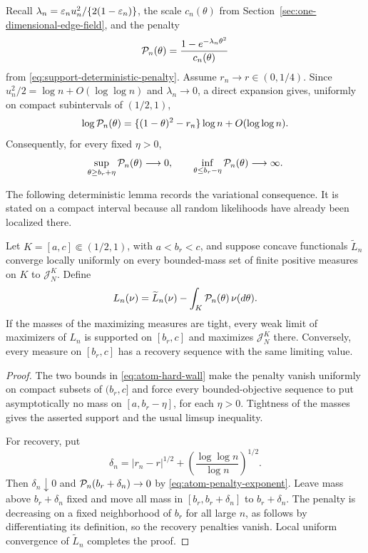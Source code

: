 Recall \(\lambda_n=\varepsilon_nu_n^2/\{2(1-\varepsilon_n)\}\), the scale
\(c_n(\theta)\) from Section~\ref{sec:one-dimensional-edge-field}, and the
penalty
\[
    \mathcal P_n(\theta)
    =\frac{1-e^{-\lambda_n\theta^2}}{c_n(\theta)}
\]
from \eqref{eq:support-deterministic-penalty}. Assume
\(r_n\to r\in(0,1/4)\). Since
\(u_n^2/2=\log n+O(\log\log n)\) and \(\lambda_n\to0\), a direct expansion
gives, uniformly on compact subintervals of \((1/2,1)\),
\begin{equation}
\label{eq:atom-penalty-exponent}
    \log\mathcal P_n(\theta)
    =\{(1-\theta)^2-r_n\}\log n+O(\log\log n).
\end{equation}
Consequently, for every fixed \(\eta>0\),
\begin{equation}
\label{eq:atom-hard-wall}
    \sup_{\theta\ge b_r+\eta}\mathcal P_n(\theta)\longrightarrow0,
    \qquad
    \inf_{\theta\le b_r-\eta}\mathcal P_n(\theta)\longrightarrow\infty.
\end{equation}

The following deterministic lemma records the variational consequence. It is
stated on a compact interval because all random likelihoods have already been
localized there.
\begin{lemma}
\label{lem:atom-hard-wall}
Let \(K=[a,c]\Subset(1/2,1)\), with \(a<b_r<c\), and suppose concave
functionals \(\widetilde L_n\) converge locally uniformly on every
bounded-mass set of finite positive measures on \(K\) to
\(\mathcal J_N^K\). Define
\[
    L_n(\nu)=\widetilde L_n(\nu)-\int_K\mathcal P_n(\theta)\,\nu(d\theta).
\]
If the masses of the maximizing measures are tight, every weak limit of
maximizers of \(L_n\) is supported on \([b_r,c]\) and maximizes
\(\mathcal J_N^K\) there. Conversely, every measure on \([b_r,c]\) has a
recovery sequence with the same limiting value.
\end{lemma}

\begin{proof}
The two bounds in \eqref{eq:atom-hard-wall} make the penalty vanish uniformly
on compact subsets of \((b_r,c]\) and force every bounded-objective sequence
to put asymptotically no mass on \([a,b_r-\eta]\), for each \(\eta>0\).
Tightness of the masses gives the asserted support and the usual limsup
inequality.

For recovery, put
\[
    \delta_n=|r_n-r|^{1/2}
       +\left(\frac{\log\log n}{\log n}\right)^{1/2}.
\]
Then \(\delta_n\downarrow0\) and
\(\mathcal P_n(b_r+\delta_n)\to0\) by
\eqref{eq:atom-penalty-exponent}. Leave mass above
\(b_r+\delta_n\) fixed and move all mass in
\([b_r,b_r+\delta_n]\) to \(b_r+\delta_n\). The penalty is decreasing on
a fixed neighborhood of \(b_r\) for all large \(n\), as follows by
differentiating its definition, so the recovery penalties vanish. Local
uniform convergence of \(\widetilde L_n\) completes the proof.
\end{proof}


